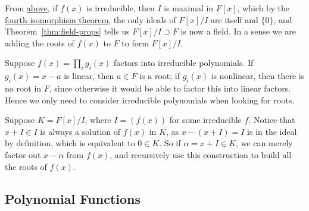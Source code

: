 \begin{remark}
    From \hyperref[thm:ideal-divisibility]{above},
    if \(f(x)\) is irreducible, then \(I\) is maximal in \(F[x]\),
    which by the \hyperref[thm:iso-4-ring]{fourth isomorphism theorem},
    the only ideals of \(F[x]/I\) are itself and \(\{0\}\),
    and Theorem~\ref{thm:field-props} tells us \(F[x]/I \supset F\) is now a field.
    In a sense we are adding the roots of \(f(x)\) to \(F\) to form \(F[x]/I\).

    Suppose \(f(x) = \prod_i g_i(x)\) factors into irreducible polynomials.
    If \(g_i(x) = x-a\) is linear, then \(a \in F\) is a root;
    if \(g_i(x)\) is nonlinear, then there is no root in \(F\),
    since otherwise it would be able to factor this into linear factors.
    Hence we only need to consider irreducible polynomials
    when looking for roots.

    Suppose \(K = F[x]/I\), where \(I = (f(x))\) for some irreducible \(f\).
    Notice that \(x+I \in I\) is always a solution of \(f(x)\) in \(K\),
    as \(x-(x+I) = I\) is in the ideal by definition,
    which is equivalent to \(0 \in K\).
    So if \(\alpha = x+I \in K\),
    we can merely factor out \(x-\alpha\) from \(f(x)\),
    and recursively use this construction to build all the roots of \(f(x)\).
\end{remark}

\subsection*{Polynomial Functions}

